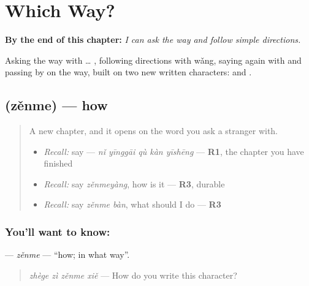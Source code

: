 
\chapter{Which Way?}
\label{ch:zh-which-way}

\begin{chapteropening}
\textbf{By the end of this chapter:} \emph{I can ask the way and follow simple directions.}

Asking the way with  … , following directions with wǎng, saying again with  and passing by on the way, built on two new written characters:  and .
\end{chapteropening}

\section[\texorpdfstring{\zh{怎么} (zěnme)}{怎么 (zěnme)}]{ (zěnme) — how}

\label{lesson:ZH-C283-zenme}



\begin{quote}
A new chapter, and it opens on the word you ask a stranger with.

\begin{itemize}
\raggedright
  \item \emph{Recall:} say  — \emph{nǐ yīnggāi qù kàn yīshēng} — \textbf{R1}, the chapter you have finished
  \item \emph{Recall:} say \emph{zěnmeyàng}, how is it — \textbf{R3}, durable
  \item \emph{Recall:} say \emph{zěnme bàn}, what should I do — \textbf{R3}
\end{itemize}
\end{quote}

\subsection*{You'll want to know: }
\textbf{} — \emph{zěnme} — \textquotedblleft{}how; in what way\textquotedblright{}.

\begin{quote}
\textbf{} \emph{zhège zì zěnme xiě} — How do you write this character?
\end{quote}

